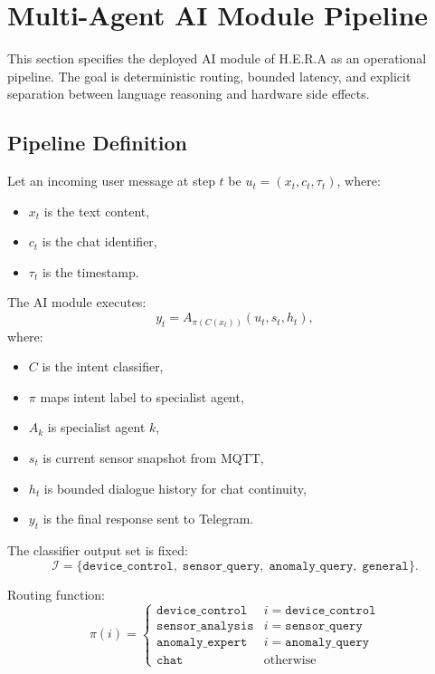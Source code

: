 \newpage
\section{Multi-Agent AI Module Pipeline}
\label{sec:multi-agent}

This section specifies the deployed AI module of H.E.R.A as an
operational pipeline. The goal is deterministic routing, bounded
latency, and explicit separation between language reasoning and
hardware side effects.

\subsection{Pipeline Definition}
\label{sec:mas-definition}

Let an incoming user message at step $t$ be
$u_t = (x_t, c_t, \tau_t)$, where:
\begin{itemize}
    \item $x_t$ is the text content,
    \item $c_t$ is the chat identifier,
    \item $\tau_t$ is the timestamp.
\end{itemize}

The AI module executes:
\begin{equation}
\label{eq:mas-pipeline}
    y_t = A_{\pi(C(x_t))}(u_t, s_t, h_t),
\end{equation}
where:
\begin{itemize}
    \item $C$ is the intent classifier,
    \item $\pi$ maps intent label to specialist agent,
    \item $A_k$ is specialist agent $k$,
    \item $s_t$ is current sensor snapshot from MQTT,
    \item $h_t$ is bounded dialogue history for chat continuity,
    \item $y_t$ is the final response sent to Telegram.
\end{itemize}

The classifier output set is fixed:
\begin{equation}
\label{eq:intent-set}
    \mathcal{I} = \{\texttt{device\_control},\; \texttt{sensor\_query},\;
    \texttt{anomaly\_query},\; \texttt{general}\}.
\end{equation}

Routing function:
\begin{equation}
\label{eq:routing-map}
\pi(i) =
\begin{cases}
\texttt{device\_control} & i = \texttt{device\_control}\\
\texttt{sensor\_analysis} & i = \texttt{sensor\_query}\\
\texttt{anomaly\_expert} & i = \texttt{anomaly\_query}\\
\texttt{chat} & \text{otherwise}
\end{cases}
\end{equation}

